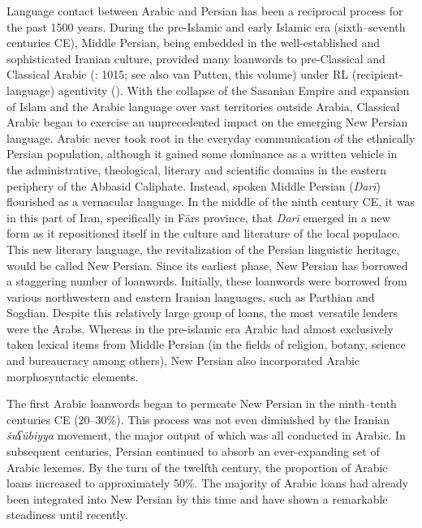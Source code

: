 \documentclass[output=paper]{langsci/langscibook}
\begin{document}
Language contact between Arabic and Persian has been a reciprocal process for the past 1500 years. During the pre-Islamic and early Islamic era (sixth–seventh centuries CE), Middle Persian, being embedded in the well-established and sophisticated Iranian culture, provided many loanwords to pre-Classical and Classical Arabic (\citealt{Gazsi2011}: 1015; see also van Putten, this volume) under RL (recipient-language) agentivity (\citealt{VanCoetsem1988,VanCoetsem2000}). With the collapse of the Sasanian Empire and expansion of Islam and the Arabic language over vast territories outside Arabia, Classical Arabic began to exercise an unprecedented impact on the emerging New Persian language. Arabic never took root in the everyday communication of the ethnically Persian population, although it gained some dominance as a written vehicle in the administrative, theological, literary and scientific domains in the eastern periphery of the Abbasid Caliphate. Instead, spoken Middle Persian (\textit{Darī}) flourished as a vernacular language. In the middle of the ninth century CE, it was in this part of Iran, specifically in Fārs province, that \textit{Darī} emerged in a new form as it repositioned itself in the culture and literature of the local populace. This new literary language, the revitalization of the Persian linguistic heritage, would be called New Persian. Since its earliest phase, New Persian has borrowed a staggering number of loanwords. Initially, these loanwords were borrowed from various northwestern and eastern Iranian languages, such as Parthian and Sogdian. Despite this relatively large group of loans, the most versatile lenders were the Arabs. Whereas in the pre-islamic era Arabic had almost exclusively taken lexical items from Middle Persian (in the fields of religion, botany, science and bureaucracy among others), New Persian also incorporated Arabic morphosyntactic elements.

The first Arabic loanwords began to permeate New Persian in the ninth–tenth centuries CE (20–30\%). This process was not even diminished by the Iranian \textit{šuʕūbiyya} movement, the major output of which was all conducted in Arabic. In subsequent centuries, Persian continued to absorb an ever-expanding set of Arabic lexemes. By the turn of the twelfth century, the proportion of Arabic loans increased to approximately 50\%. The majority of Arabic loans had already been integrated into New Persian by this time and have shown a remarkable steadiness until recently.
\end{document}
